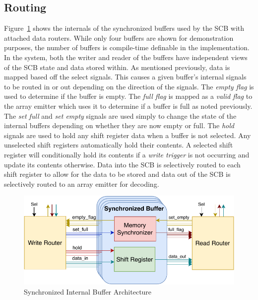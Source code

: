     \subsection{Routing}
        Figure~\ref{fig:sb_arch} shows the internals of the synchronized buffers used by the SCB with attached data routers. While only four buffers are shown for demonstration purposes, the number of buffers is compile-time definable in the implementation. In the system, both the writer and reader of the buffers have independent views of the SCB state and data stored within. As mentioned previously, data is mapped based off the select signals. This causes a given buffer's internal signals to be routed in or out depending on the direction of the signals. The {\it empty flag} is used to determine if the buffer is empty. The {\it full flag} is mapped as a {\it valid flag} to the array emitter which uses it to determine if a buffer is full as noted previously. The {\it set full} and {\it set empty} signals are used simply to change the state of the internal buffers depending on whether they are now empty or full. The {\it hold} signals are used to hold any shift register data when a buffer is not selected. Any unselected shift registers automatically hold their contents. A selected shift register will conditionally hold its contents if a {\it write trigger} is not occurring and update its contents otherwise. Data into the SCB is selectively routed to each shift register to allow for the data to be stored and data out of the SCB is selectively routed to an array emitter for decoding.

        \begin{figure}
            \centering
            \includegraphics[width=1.0\textwidth]{fig/pdp_sb_arch.pdf}
            \caption{Synchronized Internal Buffer Architecture}
            \label{fig:sb_arch}
        \end{figure}

